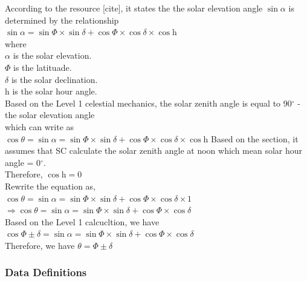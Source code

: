 \documentclass[12pt]{article}
\begin{document}
	According to the resource [cite], it states the the solar elevation angle $\sin{\alpha}$ is
determined by the relationship\\
					$\sin{\alpha} = \sin{\Phi} \times \sin{\delta} + \cos{\Phi} \times \cos{\delta} \times \cos{\text{h}}$\\
		where \\
		  $\alpha$ is the solar elevation.\\
		  $\Phi$ is the latituade.\\
		  $\delta$ is the solar declination.\\
		  $\text{h}$ is the solar hour angle.\\
Based on the Level 1 celestial mechanics, the solar zenith angle 
is equal to 90$^\circ$ - the solar elevation angle\\
			which can write as\\
$\cos{\theta} = \sin{\alpha} = \sin{\Phi} \times \sin{\delta} + \cos{\Phi} \times \cos{\delta} \times \cos{\text{h}}$
			Based on the  section, it assumes that SC calculate the solar zenith 
angle at noon which mean solar hour angle = 0$^\circ$.\\
			Therefore, $\cos{\text{h}} = 0$\\
				Rewrite the equation as,\\
$\cos{\theta} = \sin{\alpha} = \sin{\Phi} \times \sin{\delta} + \cos{\Phi} \times \cos{\delta} \times 1$\\
$\Rightarrow  \cos{\theta} = \sin{\alpha} = \sin{\Phi} \times \sin{\delta} + \cos{\Phi} \times \cos{\delta}$\\
			Based on the Level 1 calcucltion, we have\\
$\cos{\Phi \pm \delta} = \sin{\alpha} = \sin{\Phi} \times \sin{\delta} + \cos{\Phi} \times \cos{\delta}$\\
			Therefore, we have
			$\theta = \Phi \pm \delta$\\

\subsubsection{Data Definitions}\label{sec_datadef}

\iffalse{}
\end{document}
